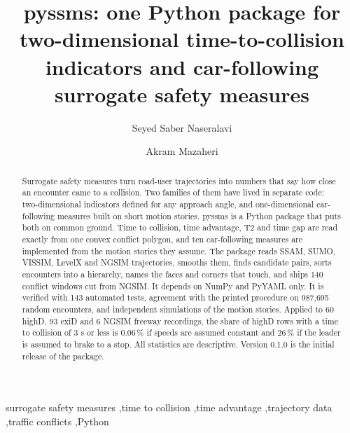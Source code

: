 \documentclass[preprint,12pt, a4paper]{elsarticle}
\begin{document}
\renewcommand{\labelenumii}{\arabic{enumi}.\arabic{enumii}}

\begin{frontmatter}

\title{pyssms: one Python package for two-dimensional time-to-collision indicators and car-following surrogate safety measures}

\author[affa]{Seyed Saber Naseralavi}
\author[affb]{Akram Mazaheri}

\address[affa]{Department of Civil Engineering, Shahid Bahonar University of Kerman, Kerman 7616914111, Iran}
\address[affb]{Department of Civil and Environmental Engineering, Tarbiat Modares University, Tehran 1411944961, Iran}

\begin{abstract}
Surrogate safety measures turn road-user trajectories into numbers that say how close an encounter came to a collision. Two families of them have lived in separate code: two-dimensional indicators defined for any approach angle, and one-dimensional car-following measures built on short motion stories. pyssms is a Python package that puts both on common ground. Time to collision, time advantage, T2 and time gap are read exactly from one convex conflict polygon, and ten car-following measures are implemented from the motion stories they assume. The package reads SSAM, SUMO, VISSIM, LevelX and NGSIM trajectories, smooths them, finds candidate pairs, sorts encounters into a hierarchy, names the faces and corners that touch, and ships 140 conflict windows cut from NGSIM. It depends on NumPy and PyYAML only. It is verified with 143 automated tests, agreement with the printed procedure on 987,695 random encounters, and independent simulations of the motion stories. Applied to 60 highD, 93 exiD and 6 NGSIM freeway recordings, the share of highD rows with a time to collision of 3 s or less is 0.06\,\% if speeds are assumed constant and 26\,\% if the leader is assumed to brake to a stop. All statistics are descriptive. Version 0.1.0 is the initial release of the package.
\end{abstract}

\begin{keyword}
surrogate safety measures \sep time to collision \sep time advantage \sep trajectory data \sep traffic conflicts \sep Python
\end{keyword}

\end{frontmatter}
\end{document}
